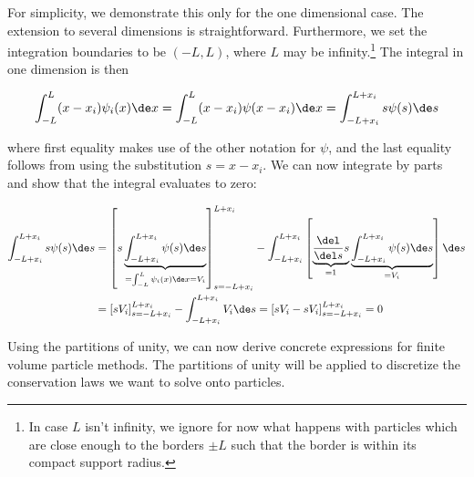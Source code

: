 For simplicity, we demonstrate this only for the one dimensional case. The extension to several
dimensions is straightforward. Furthermore, we set the integration boundaries to be $(-L, L)$,
where $L$ may be infinity.\footnote{In case $L$ isn't infinity, we ignore for now what happens with
particles which are close enough to the borders $\pm L$ such that the border is within its compact
support radius.} The integral in one dimension is then

\begin{align}
    \int_{-L}^{L} (x - x_i) \psi_i(x) \de x
    = \int_{-L}^{L} (x - x_i) \psi(x - x_i) \de x
    = \int_{-L+x_i}^{L+x_i} s \psi(s) \de s
 \end{align}

where first equality makes use of the other notation for $\psi$, and the last equality follows from
using the substitution $s = x - x_i$. We can now integrate by parts and show that the integral
evaluates to zero:

\begin{align}
    \int_{-L+x_i}^{L+x_i} s \psi(s) \de s &=
    \left[
        s \underbrace{\int_{-L+x_i}^{L+x_i} \psi(s) \de s}_{=\int_{-L}^{L} \psi_i(x) \de x = V_i }
    \right]_{s = -L+x_i}^{L+x_i} -
    \int_{-L+x_i}^{L+x_i} \left[
    \underbrace{\frac{\del}{\del s} s}_{= 1}
    \underbrace{\int_{-L+x_i}^{L+x_i} \psi(s) \de s}_{= V_i} \right] \de s \\
%
    &= \left[ s V_i \right]_{s = -L+x_i}^{L+x_i} - \int_{-L+x_i}^{L+x_i} V_i \de s
    = \left[ s V_i  - s V_i \right]_{s = -L+x_i}^{L+x_i} = 0
\end{align}



Using the partitions of unity, we can now derive concrete expressions for finite volume particle
methods. The partitions of unity will be applied to discretize the conservation laws we want to
solve onto particles.
